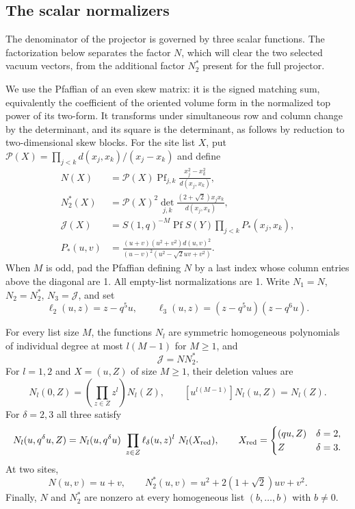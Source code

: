 \subsection{The scalar normalizers}

The denominator of the projector is governed by three scalar functions.
The factorization below separates the factor $N$, which will clear the
two selected vacuum vectors, from the additional factor $N_2^*$ present
for the full projector.

We use the Pfaffian of an even skew matrix: it is the signed matching
sum, equivalently the coefficient of the oriented volume form in the
normalized top power of its two-form. It transforms under simultaneous
row and column change by the determinant, and its square is the
determinant, as follows by reduction to two-dimensional skew blocks.
For the site list $X$, put
$\mathcal P(X)=\prod_{j<k}d(x_j,x_k)/(x_j-x_k)$ and define
\[
\begin{split}
 N(X)&=\mathcal P(X)\operatorname{Pf}_{j,k}\frac{x_j^2-x_k^2}{d(x_j,x_k)},\\
 N_2^*(X)&=\mathcal P(X)^2\det_{j,k}\frac{(2+\sqrt2)x_jx_k}{d(x_j,x_k)},\\
 \mathcal J(X)&=S(1,q)^{-M}\operatorname{Pf} S(Y)\prod_{j<k}P_*(x_j,x_k),\\
 P_*(u,v)&=\frac{(u+v)(u^2+v^2)d(u,v)^2}{(u-v)^2(u^2-\sqrt2uv+v^2)} .
 \end{split}
\]
When $M$ is odd, pad the Pfaffian defining $N$ by a last index whose
column entries above the diagonal are 1. All empty-list normalizations
are 1. Write $N_1=N$, $N_2=N_2^*$, $N_3=\mathcal J$, and set
\[
\ell_2(u,z)=z-q^5u,\qquad
\ell_3(u,z)=(z-q^5u)(z-q^6u).
\]
\begin{lemma}\label{j:scalar-normalizers}
For every list size $M$, the functions $N_l$ are symmetric homogeneous
polynomials of individual degree at most $l(M-1)$ for $M\ge1$, and
\[
\mathcal J=N N_2^*.
\]
For $l=1,2$ and $X=(u,Z)$ of size $M\ge1$, their deletion values are
\begin{equation}\label{j:normalizer-deletion}
N_l(0,Z)=\left(\prod_{z\in Z}z^l\right)N_l(Z),
\qquad [u^{l(M-1)}]N_l(u,Z)=N_l(Z).
\end{equation}
For $\delta=2,3$ all three satisfy
\begin{equation}\label{j:normalizer-fusion}
N_l(u,q^\delta u,Z)=N_l(u,q^\delta u)\ \prod_{z\in Z}\ell_\delta(u,z)^l\ N_l(X_{\rm red}),\qquad
 X_{\rm red}=\begin{cases}(qu,Z)&\delta=2,\\Z&\delta=3.\end{cases}
\end{equation}
At two sites,
\[
N(u,v)=u+v,\qquad
N_2^*(u,v)=u^2+2(1+\sqrt2)uv+v^2.
\]
Finally, $N$ and $N_2^*$ are nonzero at every homogeneous list
$(b,\ldots,b)$ with $b\ne0$.
\end{lemma}
